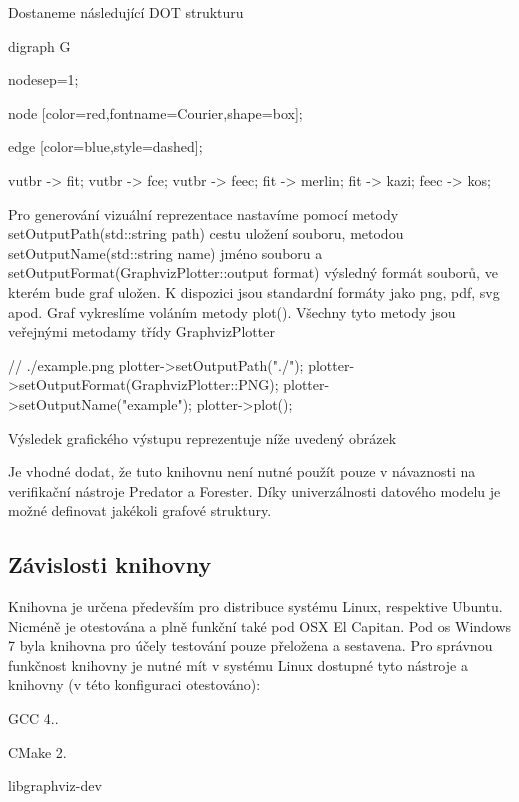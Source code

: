 Dostaneme následující D\+OT strukturu \begin{DoxyVerb}digraph G {
    nodesep=1;

    node [color=red,fontname=Courier,shape=box];

    edge [color=blue,style=dashed];

    vutbr -> fit;
    vutbr -> fce;
    vutbr -> feec;
    fit -> merlin;
    fit -> kazi;
    feec -> kos;
}
\end{DoxyVerb}


Pro generování vizuální reprezentace nastavíme pomocí metody set\+Output\+Path(std\+::string path) cestu uložení souboru, metodou set\+Output\+Name(std\+::string name) jméno souboru a set\+Output\+Format(\+Graphviz\+Plotter\+::output format) výsledný formát souborů, ve kterém bude graf uložen. K dispozici jsou standardní formáty jako png, pdf, svg apod. Graf vykreslíme voláním metody plot(). Všechny tyto metody jsou veřejnými metodamy třídy Graphviz\+Plotter \begin{DoxyVerb}// ./example.png
plotter->setOutputPath("./");
plotter->setOutputFormat(GraphvizPlotter::PNG);
plotter->setOutputName("example");
plotter->plot();
\end{DoxyVerb}


Výsledek grafického výstupu reprezentuje níže uvedený obrázek



Je vhodné dodat, že tuto knihovnu není nutné použít pouze v návaznosti na verifikační nástroje Predator a Forester. Díky univerzálnosti datového modelu je možné definovat jakékoli grafové struktury.

\subsection*{Závislosti knihovny}

Knihovna je určena především pro distribuce systému Linux, respektive Ubuntu. Nicméně je otestována a plně funkční také pod O\+SX El Capitan. Pod os Windows 7 byla knihovna pro účely testování pouze přeložena a sestavena. Pro správnou funkčnost knihovny je nutné mít v systému Linux dostupné tyto nástroje a knihovny (v této konfiguraci otestováno)\+:


\begin{DoxyItemize}
\item G\+CC 4..
\item C\+Make 2.
\item libgraphviz-\/dev
\end{DoxyItemize}

